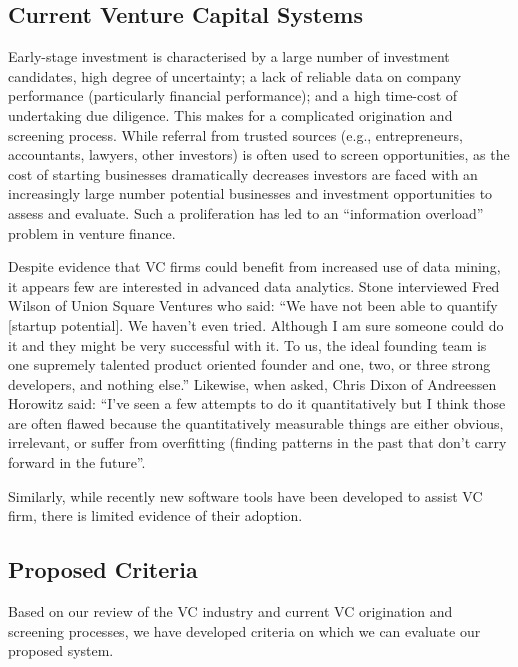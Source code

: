 \documentclass[../thesis/thesis.tex]{subfiles}
\begin{document}
\begin{refsection}
\subsection{Current Venture Capital Systems}

Early-stage investment is characterised by a large number of investment candidates, high degree of uncertainty; a lack of reliable data on company performance (particularly financial performance); and a high time-cost of undertaking due diligence. This makes for a complicated origination and screening process. While referral from trusted sources (e.g., entrepreneurs, accountants, lawyers, other investors) is often used to screen opportunities, as the cost of starting businesses dramatically decreases investors are faced with an increasingly large number potential businesses and investment opportunities to assess and evaluate. Such a proliferation has led to an “information overload” problem in venture finance.

Despite evidence that VC firms could benefit from increased use of data mining, it appears few are interested in advanced data analytics. Stone \cite{stone2014} interviewed Fred Wilson of Union Square Ventures who said: ``We have not been able to quantify [startup potential]. We haven’t even tried. Although I am sure someone could do it and they might be very successful with it. To us, the ideal founding team is one supremely talented product oriented founder and one, two, or three strong developers, and nothing else.'' Likewise, when asked, Chris Dixon of Andreessen Horowitz said: ``I’ve seen a few attempts to do it quantitatively but I think those are often flawed because the quantitatively measurable things are either obvious, irrelevant, or suffer from overfitting (finding patterns in the past that don’t carry forward in the future''.

Similarly, while recently new software tools have been developed to assist VC firm, there is limited evidence of their adoption.

\subsection{Proposed Criteria}

Based on our review of the VC industry and current VC origination and screening processes, we have developed criteria on which we can evaluate our proposed system.

\begin{enumerate}


\end{enumerate}
\end{refsection}
\end{document}
